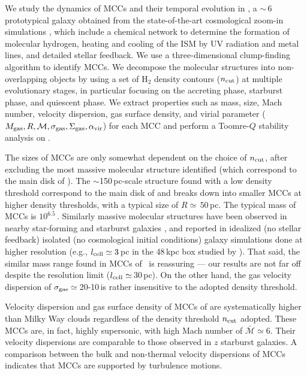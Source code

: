 \IfFileExists{emulateapjlegacy.cls}{\documentclass[iop]{emulateapjlegacy}}{\documentclass[iop]{emulateapj}}
\begin{document}
We study the dynamics of MCCs and their temporal evolution in \flower, a \z$\sim$\,6 prototypical galaxy obtained from the state-of-the-art cosmological zoom-in simulations , which include a chemical network to determine the formation of molecular hydrogen, heating and cooling of the ISM by UV radiation and metal lines, and detailed stellar feedback.
%
We use a three-dimensional clump-finding algorithm to identify MCCs. We decompose the molecular structures into non-overlapping objects by using a set of H$_2$ density contours ($n_{\rm cut}$) at multiple evolutionary stages, in particular focusing on the accreting phase, starburst phase, and quiescent phase. We extract properties such as mass, size, Mach number, velocity dispersion, gas surface density, and virial parameter ($M_{\rm gas}, R, \mathcal{M}, \sigma_{\rm gas}, \Sigma_{\rm gas}, \alpha_{\rm vir}$) for each MCC and perform a Toomre-$Q$ stability analysis on \flower.

The sizes of MCCs are only somewhat dependent on the choice of $n_{\rm cut}$, after excluding the 
most massive molecular structure identified (which correspond to the main disk of \flower). 
The $\sim$150\,pc-scale structure found with a low density threshold correspond to the main disk of \flower 
and breaks down into smaller MCCs at higher density thresholds, with a typical size of $R\simeq\,50$\,pc.
%
The typical mass of MCCs is $10^{6.5}$\,\Msun. Similarly massive molecular structures have been observed in nearby star-forming and starburst galaxies \citep[e.g.,][]{Keto05a, DonovanMeyer13a, Colombo14a, Leroy15a}, and reported in idealized (no stellar feedback) isolated (no cosmological initial conditions) galaxy simulations done at higher resolution (e.g., $l_{\rm cell}\simeq3$\,pc in the 48\,kpc box studied by \citealt{Behrendt16a}). That said, the similar mass range found in MCCs of \flower\ is reassuring --- our results are not far off despite the resolution limit ($l_{\rm cell}\simeq$\,30\,pc). On the other hand, the gas velocity dispersion 
of $\sigma_{\rm gas}\simeq$\,20-10\,\kms is rather insensitive to the adopted density threshold.

Velocity dispersion and gas surface density of MCCs of \flower are systematically higher than Milky Way clouds regardless of the density threshold $n_{\rm cut}$ adopted. These MCCs are, in fact, highly supersonic, with high Mach number of $\bar{\mathcal{M}}\simeq6$. Their velocity dispersions are comparable to those observed in $z$ starburst galaxies. A comparison between the bulk and non-thermal velocity dispersions of MCCs indicates that MCCs
are supported by turbulence motions.
\end{document}
